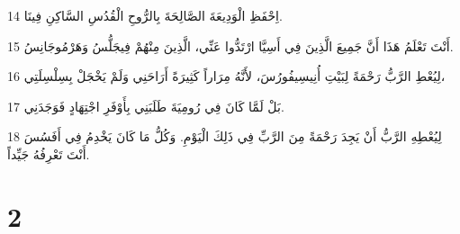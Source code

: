\par 14 اِحْفَظِ الْوَدِيعَةَ الصَّالِحَةَ بِالرُّوحِ الْقُدُسِ السَّاكِنِ فِينَا.
\par 15 أَنْتَ تَعْلَمُ هَذَا أَنَّ جَمِيعَ الَّذِينَ فِي أَسِيَّا ارْتَدُّوا عَنِّي، الَّذِينَ مِنْهُمْ فِيجَلُّسُ وَهَرْمُوجَانِسُ.
\par 16 لِيُعْطِ الرَّبُّ رَحْمَةً لِبَيْتِ أُنِيسِيفُورُسَ، لأَنَّهُ مِرَاراً كَثِيرَةً أَرَاحَنِي وَلَمْ يَخْجَلْ بِسِلْسِلَتِي،
\par 17 بَلْ لَمَّا كَانَ فِي رُومِيَةَ طَلَبَنِي بِأَوْفَرِ اجْتِهَادٍ فَوَجَدَنِي.
\par 18 لِيُعْطِهِ الرَّبُّ أَنْ يَجِدَ رَحْمَةً مِنَ الرَّبِّ فِي ذَلِكَ الْيَوْمِ. وَكُلُّ مَا كَانَ يَخْدِمُ فِي أَفَسُسَ أَنْتَ تَعْرِفُهُ جَيِّداً.

\chapter{2}

